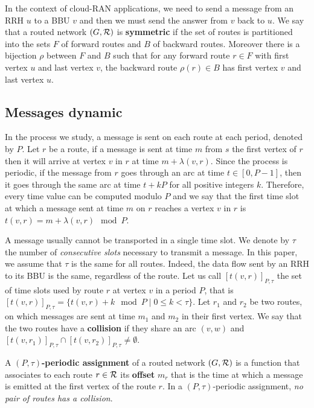 \documentclass[a4paper,10pt]{IEEEtran}
\begin{document}
   In the context of cloud-RAN applications, we need to send a message from an RRH $u$ to a BBU $v$ and then 
      we must send the answer from $v$ back to $u$. We say that a routed network $(G, {\cal R})$ is \textbf{symmetric} if the set of routes is partitioned into the sets $F$ of forward routes and $B$ of backward routes. Moreover there is a bijection $\rho$ between $F$ and $B$ such that for any forward route $r \in F$ with first vertex $u$ and last vertex $v$, the backward route $\rho(r) \in B$ has first vertex $v$ and last vertex $u$. 
       

   \subsection{Messages dynamic}
      
      In the process we study, a message is sent on each route at each period, denoted by $P$.
      Let $r$ be a route, if a message is sent at time $m$ from $s$ the first vertex of $r$ then it will arrive at vertex $v$ in $r$ at time $m + \lambda(v,r)$. Since the process is periodic, if the message from $r$ goes through an arc at time $t\in [0,P-1]$, 
      then it goes through the same arc at time $t+kP$ for all positive integers $k$. Therefore, every time value can be computed modulo $P$ and we say that the first time slot at which a message sent at time $m$ on $r$ reaches a vertex $v$ in $r$ is $t(v,r) = m + \lambda(v,r)\mod P$. 
      
      A message usually cannot be transported in a single time slot. We denote by $\tau$ the number 
      of \emph{consecutive slots} necessary to transmit a message. In this paper, we assume that $\tau$ is the same for all routes. Indeed, the data flow sent by an RRH to its BBU is the same, regardless of the route. Let us call $[t(v,r)]_{P,\tau}$ the set of time slots used by route $r$ at vertex $v$ in a period $P$, that is $[t(v,r)]_{P,\tau} = \{t(v,r) + k \mod P \mid 0 \leq k < \tau \}$. 
      Let $r_1$ and $r_2$ be two routes, on which messages are sent at time $m_1$ and $m_2$ in their first vertex.
      We say that the two routes have a {\bf collision} if they share an arc $(v,w)$ and $[t(v,r_{1})]_{P,\tau} \cap [t(v,r_{2})]_{P,\tau} \neq \emptyset$.
      
         A {\bf $(P,\tau)$-periodic assignment} of a routed network $(G,\cal R)$ is a function that associates to each route 
         $r \in \cal R$ its \textbf{offset} $m_r$ that is the time at which a message is emitted at the first vertex of the route $r$.  In a $(P,\tau)$-periodic assignment, \emph{no pair of routes has a collision}.
                     
\end{document}
